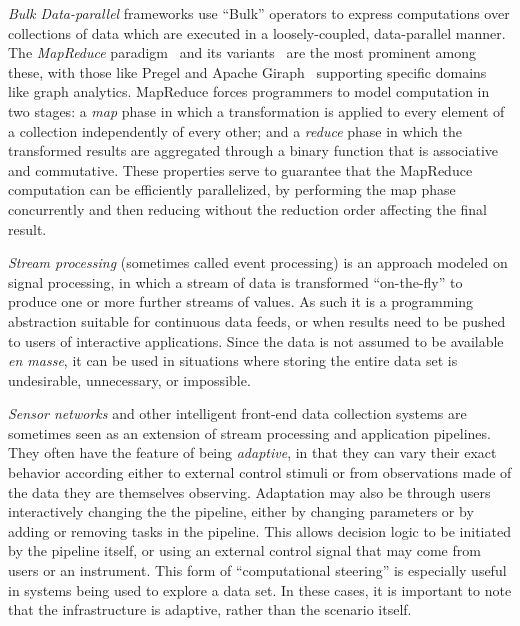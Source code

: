 {\em Bulk Data-parallel} frameworks use ``Bulk'' operators to express
computations over collections of data which are executed in a loosely-coupled,
data-parallel manner.  The {\em MapReduce} paradigm~\cite{MapReduce} and its
variants~\cite{twister,hmr} are the most prominent among these, with those like
Pregel and Apache Giraph~\cite{pregel} supporting specific domains like graph
analytics. MapReduce forces programmers to model computation in two stages: a
\emph{map} phase in which a transformation is applied to every element of a
collection independently of every other; and a \emph{reduce} phase in which the
transformed results are aggregated through a binary function that is associative
and commutative.  These properties serve to guarantee that the MapReduce
computation can be efficiently parallelized, by performing the map phase
concurrently and then reducing without the reduction order affecting the final
result.

{\em Stream processing} (sometimes called event processing) is an approach modeled
on signal processing, in which a stream of data is transformed ``on-the-fly'' to produce one or
more further streams of values. As such it is a programming
abstraction suitable for continuous data feeds, or when results need
to be pushed to users of interactive applications. Since the data is
not assumed to be available \textit{en masse}, it can be used in
situations where storing the entire data set is undesirable,
unnecessary, or impossible.

{\em Sensor networks} and other intelligent front-end data collection systems are sometimes seen as an extension of stream processing and application pipelines.
They often have the feature of being \emph{adaptive}, in that they can vary their exact behavior according either to external control stimuli or from observations made of the data they are
themselves observing. Adaptation may also be through users interactively changing the
the pipeline, either by changing parameters or by adding or removing
tasks in the pipeline. This allows decision logic to be initiated by
the pipeline itself, or using an external control signal that may come
from users or an instrument. This form of ``computational steering''
is especially useful in systems being used to explore a data set. In these cases, it is important to
note that the infrastructure is adaptive, rather than the scenario itself.


